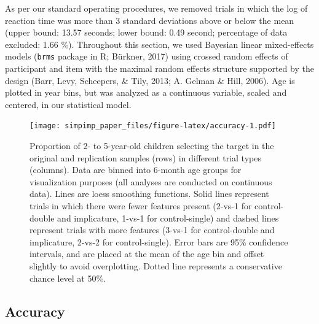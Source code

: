 \documentclass[man]{apa6}
\begin{document}
As per our standard operating procedures, we removed trials in which the
log of reaction time was more than 3 standard deviations above or below
the mean (upper bound: 13.57 seconds; lower bound: 0.49 second;
percentage of data excluded: 1.66 \%). Throughout this section, we used
Bayesian linear mixed-effects models (\texttt{brms} package in R;
Bürkner, 2017) using crossed random effects of participant and item with
the maximal random effects structure supported by the design (Barr,
Levy, Scheepers, \& Tily, 2013; A. Gelman \& Hill, 2006). Age is plotted
in year bins, but was analyzed as a continuous variable, scaled and
centered, in our statistical model.

\begin{figure}
\centering
\texttt{[image: simpimp\_paper\_files/figure-latex/accuracy-1.pdf]}
\caption{\label{fig:accuracy}Proportion of 2- to 5-year-old children
selecting the target in the original and replication samples (rows) in
different trial types (columns). Data are binned into 6-month age groups
for visualization purposes (all analyses are conducted on continuous
data). Lines are loess smoothing functions. Solid lines represent trials
in which there were fewer features present (2-vs-1 for control-double
and implicature, 1-vs-1 for control-single) and dashed lines represent
trials with more features (3-vs-1 for control-double and implicature,
2-vs-2 for control-single). Error bars are 95\% confidence intervals,
and are placed at the mean of the age bin and offset slightly to avoid
overplotting. Dotted line represents a conservative chance level at
50\%.}
\end{figure}

\subsection{Accuracy}\label{accuracy}
\end{document}
